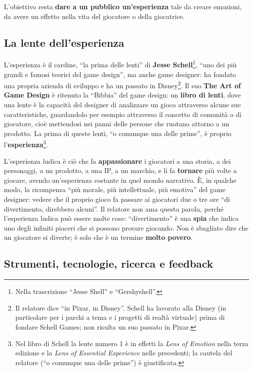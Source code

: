 L'obiettivo resta \textbf{dare a un pubblico un'esperienza} tale da creare
emozioni, da avere un effetto nella vita del giocatore o della giocatrice.

\subsection{La lente dell'esperienza}

L'esperienza è il cardine, ``la prima delle lenti'' di \textbf{Jesse
Schell}\footnote{Nella trascrizione ``Jesse Shell'' e ``Gershyshell''.},
``uno dei più grandi e famosi teorici del game design'', ma anche game
designer: ha fondato una propria azienda di sviluppo e ha un passato in
Disney\footnote{Il relatore dice ``in Pixar, in Disney''. Schell ha lavorato
alla Disney (in particolare per i parchi a tema e i progetti di realtà
virtuale) prima di fondare Schell Games; non risulta un suo passato in Pixar.}.
Il suo \textbf{The Art of Game Design} è ritenuto la ``Bibbia'' del game
design: un \textbf{libro di lenti}, dove una lente è la capacità del designer
di analizzare un gioco attraverso alcune sue caratteristiche, guardandolo per
esempio attraverso il concetto di comunità o di giocatore, cioè mettendosi nei
panni delle persone che ruotano attorno a un prodotto. La prima di queste lenti,
``o comunque una delle prime'', è proprio l'\textbf{esperienza}\footnote{Nel
libro di Schell la lente numero 1 è in effetti la \emph{Lens of Emotion} nella
terza edizione e la \emph{Lens of Essential Experience} nelle precedenti; la
cautela del relatore (``o comunque una delle prime'') è giustificata.}.

L'esperienza ludica è ciò che fa \textbf{appassionare} i giocatori a una storia,
a dei personaggi, a un prodotto, a una IP, a un marchio, e li fa
\textbf{tornare} più volte a giocare, avendo un'esperienza costante in quel
mondo narrativo. È, in qualche modo, la ricompensa ``più morale, più
intellettuale, più emotiva'' del game designer: vedere che il proprio gioco fa
passare ai giocatori due o tre ore ``di divertimento, direbbero alcuni''. Il
relatore non ama questa parola, perché l'esperienza ludica può essere molte
cose: ``divertimento'' è una \textbf{spia} che indica uno degli infiniti piaceri
che si possono provare giocando. Non è sbagliato dire che un giocatore si
diverte; è solo che è un termine \textbf{molto povero}.

\subsection{Strumenti, tecnologie, ricerca e feedback}

